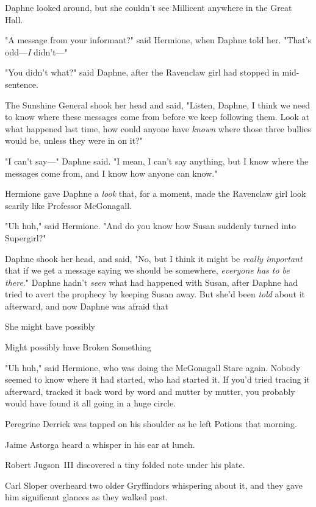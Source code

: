 Daphne looked around, but she couldn't see Millicent anywhere in the Great Hall.

"A message from your informant?" said Hermione, when Daphne told her. "That's
odd---\emph{I} didn't\mbox{---}"

"You didn't what?" said Daphne, after the Ravenclaw girl had stopped in
mid-sentence.

The Sunshine General shook her head and said, "Listen, Daphne, I think we need
to know where these messages come from before we keep following them. Look at
what happened last time, how could anyone have \emph{known} where those three
bullies would be, unless they were in on it?"

"I can't say\mbox{---}" Daphne said. "I mean, I can't say anything, but I know where
the messages come from, and I know how anyone can know."

Hermione gave Daphne a \emph{look} that, for a moment, made the Ravenclaw girl
look scarily like Professor McGonagall.

"Uh huh," said Hermione. "And do you know how Susan suddenly turned into
Supergirl?"

Daphne shook her head, and said, "No, but I think it might be \emph{really
important} that if we get a message saying we should be somewhere,
\emph{everyone has to be there}." Daphne hadn't \emph{seen} what had happened
with Susan, after Daphne had tried to avert the prophecy by keeping Susan away.
But she'd been \emph{told} about it afterward, and now Daphne was afraid
that{\el}

She might have possibly{\el}

Might possibly have Broken Something{\el}

"Uh huh," said Hermione, who was doing the McGonagall Stare again.
\sbreak
Nobody seemed to know where it had started, who had started it. If you'd tried
tracing it afterward, tracked it back word by word and mutter by mutter, you
probably would have found it all going in a huge circle.

Peregrine Derrick was tapped on his shoulder as he left Potions that morning.

Jaime Astorga heard a whisper in his ear at lunch.

Robert Jugson~III discovered a tiny folded note under his plate.

Carl Sloper overheard two older Gryffindors whispering about it, and they gave
him significant glances as they walked past.


